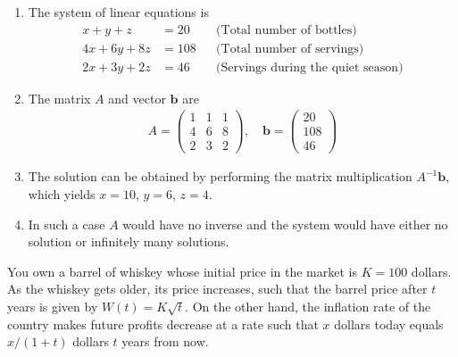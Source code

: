 \documentclass[11pt]{exam}
\begin{document}
\begin{questions}
\begin{solution}[0cm]
    \begin{enumerate}[leftmargin = 0.5cm, label = (\alph*), rightmargin = 0.2cm]
        
        \item The system of linear equations is
        \begin{align*}
            x + y + z &= 20  && \text{(Total number of bottles)} \\
            4x + 6y + 8z &= 108 && \text{(Total number of servings)} \\
            2x + 3y + 2z &= 46 && \text{(Servings during the quiet season)}
        \end{align*}

        \item The matrix $A$ and vector $\pmb{b}$ are
        \begin{align*}
            A = 
            \begin{pmatrix}
                1 & 1 & 1 \\
                4 &  6 &  8 \\
                2 &  3 & 2
            \end{pmatrix}, \quad
            \pmb{b} = 
            \begin{pmatrix}
                20 \\
                108 \\
                46
            \end{pmatrix}
        \end{align*}

        \item The solution can be obtained by performing the matrix multiplication $A^{-1}\pmb{b}$, which yields $x = 10$, $y = 6$, $z = 4$.

        \item In such a case $A$ would have no inverse and the system would have either no solution or infinitely many solutions.
        
    \end{enumerate}
\end{solution}

\question[3]
     You own a barrel of whiskey whose initial price in the market is $K = 100$ dollars. As the whiskey gets older, its price increases, such that the barrel price after $t$ years is given by $W(t) = K\sqrt{t}$. On the other hand, the inflation rate of the country makes future profits decrease at a rate such that $x$ dollars today equals $x/(1 + t)$ dollars $t$ years from now. 


\end{questions}
\end{document}
